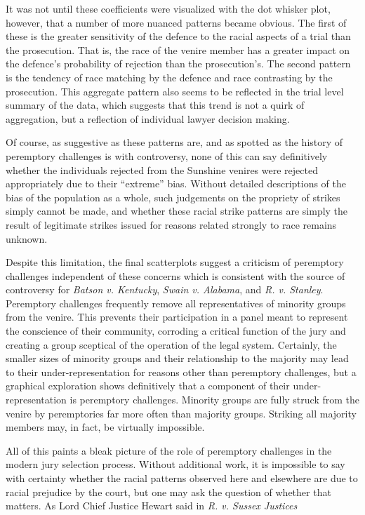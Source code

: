 It was not until these coefficients were visualized with the dot whisker plot, however, that a number of more nuanced patterns
became obvious. The first of these is the greater sensitivity of the
defence to the racial aspects of a trial than the
prosecution. That is, the race of the venire member has a greater impact on the defence's probability of rejection than the
prosecution's. The second pattern is the tendency of race matching by
the defence and race contrasting by the prosecution. This aggregate pattern also seems to be reflected in the trial level
summary of the data, which suggests that this trend is not a quirk of
aggregation, but a reflection of individual lawyer decision making.

Of course, as suggestive as these patterns are, and as spotted as the history of peremptory challenges is with controversy, none
of this can say definitively whether the individuals rejected from the
Sunshine venires were rejected appropriately due to their ``extreme''
bias. Without detailed descriptions of the bias of the population as a whole, such judgements on the propriety of strikes simply
cannot be made, and whether these racial strike patterns are simply the result of legitimate strikes issued for reasons related
strongly to race remains unknown.

Despite this limitation, the final scatterplots suggest a criticism of
peremptory challenges independent of these concerns which is consistent with the source
of controversy for \textit{Batson v. Kentucky}, \textit{Swain v. Alabama}, and \textit{R. v. Stanley}. Peremptory challenges
frequently remove all representatives of minority groups from the
venire. This prevents their participation in a panel meant to
represent the conscience of their community, corroding a critical function of the jury and creating a group
sceptical of the operation of the legal system. Certainly, the smaller sizes of minority groups and their relationship to the
majority may lead to their under-representation for reasons other than peremptory challenges, but a graphical exploration shows
definitively that a component of their under-representation is
peremptory challenges. Minority groups are fully struck from the
venire by peremptories far more often than majority groups. Striking
all majority members may, in fact, be virtually impossible.

All of this paints a bleak picture of the role of peremptory challenges in the modern jury selection process. Without additional
work, it is impossible to say with certainty whether the racial patterns observed here and elsewhere are due to racial prejudice
by the court, but one may ask the question of whether that matters. As Lord Chief Justice Hewart said in \textit{R. v. Sussex
  Justices}

